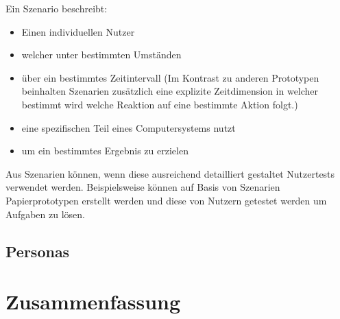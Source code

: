  Ein Szenario beschreibt:

\begin{itemize}
	\item Einen individuellen Nutzer
	\item welcher unter bestimmten Umständen
	\item über ein bestimmtes Zeitintervall (Im Kontrast zu anderen Prototypen beinhalten Szenarien zusätzlich eine explizite Zeitdimension in welcher bestimmt wird welche Reaktion auf eine bestimmte Aktion folgt.)
	\item eine spezifischen Teil eines Computersystems nutzt
	\item um ein bestimmtes Ergebnis zu erzielen
\end{itemize}

 \cite[S.~101]{Nielsen1994} Aus Szenarien können, wenn diese ausreichend detailliert gestaltet Nutzertests verwendet werden. Beispielsweise können auf Basis von Szenarien Papierprototypen erstellt werden 
 und diese von Nutzern getestet werden um Aufgaben zu lösen. 

\subsection{Personas}

\section{Zusammenfassung}




